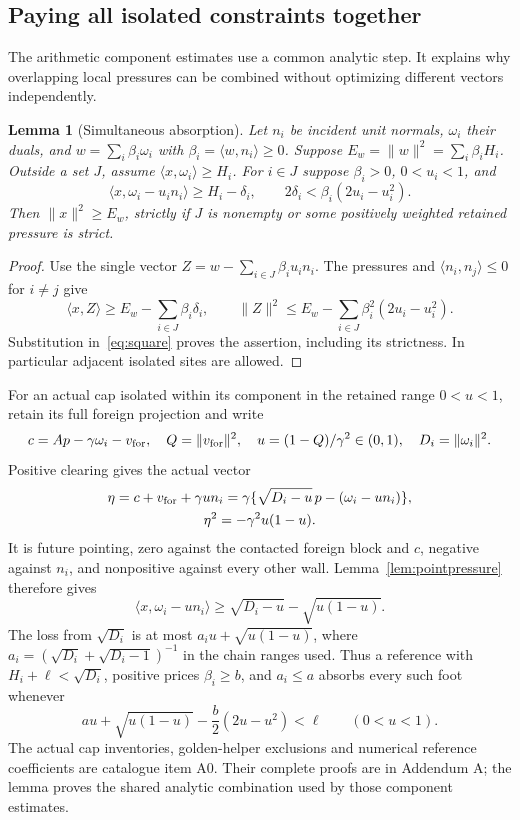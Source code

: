 \documentclass[11pt]{article}
\newtheorem{lemma}[theorem]{Lemma}
\theoremstyle{remark}\newtheorem{remark}[theorem]{Remark}
\numberwithin{equation}{section}
\newcommand{\ip}[2]{\langle #1,#2\rangle}
\newcommand{\norm}[1]{\lVert #1\rVert}
\begin{document}
\subsection{Paying all isolated constraints together}
The arithmetic component estimates use a common analytic step. It
explains why overlapping local pressures can be combined without
optimizing different vectors independently.
\begin{lemma}[Simultaneous absorption]\label{lem:absorption}
Let $n_i$ be incident unit normals, $\omega_i$ their duals, and
$w=\sum_i\beta_i\omega_i$ with $\beta_i=\ip{w}{n_i}\ge0$.
Suppose $E_w=\norm{w}^2=\sum_i\beta_iH_i$. Outside a set $J$,
assume $\ip{x}{\omega_i}\ge H_i$. For $i\in J$ suppose
$\beta_i>0$, $0<u_i<1$, and
\[
 \ip{x}{\omega_i-u_i n_i}\ge H_i-\delta_i,\qquad
 2\delta_i<\beta_i(2u_i-u_i^2).
\]
Then $\norm{x}^2\ge E_w$, strictly if $J$ is nonempty or some
positively weighted retained pressure is strict.
\end{lemma}
\begin{proof}
Use the single vector $Z=w-\sum_{i\in J}\beta_i u_i n_i$.
The pressures and $\ip{n_i}{n_j}\le0$ for $i\ne j$ give
\[
 \ip{x}{Z}\ge E_w-\sum_{i\in J}\beta_i \delta_i,\qquad
 \norm{Z}^2\le E_w-\sum_{i\in J}\beta_i^2(2u_i-u_i^2).
\]
Substitution in~\eqref{eq:square} proves the assertion, including
its strictness. In particular adjacent isolated sites are allowed.
\end{proof}

For an actual cap isolated within its component in the retained
range $0<u<1$, retain its full foreign projection and write
\[
 c=Ap-\gamma\omega_i-v_{\rm for},\quad Q=\norm{v_{\rm for}}^2,
 \quad u=(1-Q)/\gamma^2\in(0,1),\quad D_i=\norm{\omega_i}^2.
\]
Positive clearing gives the actual vector
\[
\begin{gathered}
 \eta=c+v_{\rm for}+\gamma u n_i
 =\gamma\{\sqrt{D_i-u}\,p-(\omega_i-un_i)\},\\
 \eta^2=-\gamma^2u(1-u).
\end{gathered}
\]
It is future pointing, zero against the contacted foreign block
and $c$, negative against $n_i$, and nonpositive against every
other wall. Lemma~\ref{lem:pointpressure} therefore gives
\[
 \ip{x}{\omega_i-un_i}\ge\sqrt{D_i-u}-\sqrt{u(1-u)}.
\]
The loss from $\sqrt{D_i}$ is at most
$a_i u+\sqrt{u(1-u)}$, where
$a_i=(\sqrt{D_i}+\sqrt{D_i-1})^{-1}$ in the chain ranges used.
Thus a reference with $H_i+\ell<\sqrt{D_i}$, positive prices
$\beta_i\ge b$, and $a_i\le a$ absorbs every such foot whenever
\[
 au+\sqrt{u(1-u)}-\frac b2(2u-u^2)<\ell
 \qquad(0<u<1).
\]
The actual cap inventories, golden-helper exclusions and numerical
reference coefficients are catalogue item A0. Their complete
proofs are in Addendum A; the lemma proves the shared analytic
combination used by those component estimates.
\end{document}
